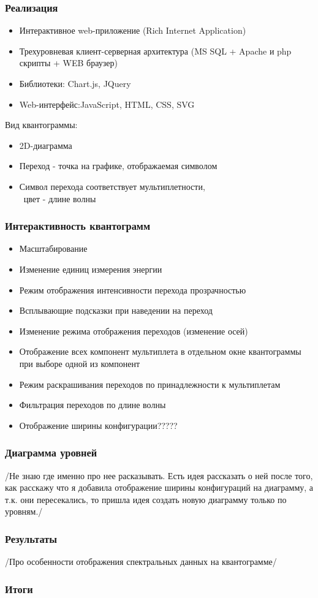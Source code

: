 \documentclass{beamer}
\begin{document}
\begin{frame}
\frametitle{Реализация}
    \begin{itemize}
        \item Интерактивное web-приложение (Rich Internet Application)
        \item Трехуровневая клиент-серверная архитектура (MS SQL + Apache и php скрипты + WEB браузер)
        \item Библиотеки: Chart.js, JQuery
        \item Web-интерфейс:JavaScript, HTML, CSS, SVG
    \end{itemize}
    Вид квантограммы:
    \begin{itemize}
        \item 2D-диаграмма
        \item Переход - точка на графике, отображаемая символом
        \item Символ перехода соответствует мультиплетности, 
       \\~цвет - длине волны
    \end{itemize}
\end{frame}

\begin{frame}
\frametitle{Интерактивность квантограмм}
    \begin{itemize}
        \item Масштабирование
        \item Изменение единиц измерения энергии
        \item Режим отображения интенсивности перехода прозрачностью
        \item Всплывающие подсказки при наведении на переход 
        \item Изменение режима отображения переходов (изменение осей)
        \item Отображение всех компонент мультиплета в отдельном окне квантограммы при выборе одной из компонент
        \item Режим раскрашивания переходов по принадлежности к мультиплетам
        \item Фильтрация переходов по длине волны
        \item Отображение ширины конфигурации?????
    \end{itemize}
\end{frame}

\begin{frame}
\frametitle{Диаграмма уровней}
    /Не знаю где именно про нее расказывать. Есть идея рассказать о ней после того, как расскажу что я добавила отображение ширины конфигураций на диаграмму, а т.к. они пересекались, то пришла идея создать новую диаграмму только по уровням./
\end{frame}

\begin{frame}
\frametitle{Результаты }
    /Про особенности отображения спектральных данных на квантограмме/
\end{frame}

\begin{frame}
\frametitle{Итоги }
  
\end{frame}
\end{document}
